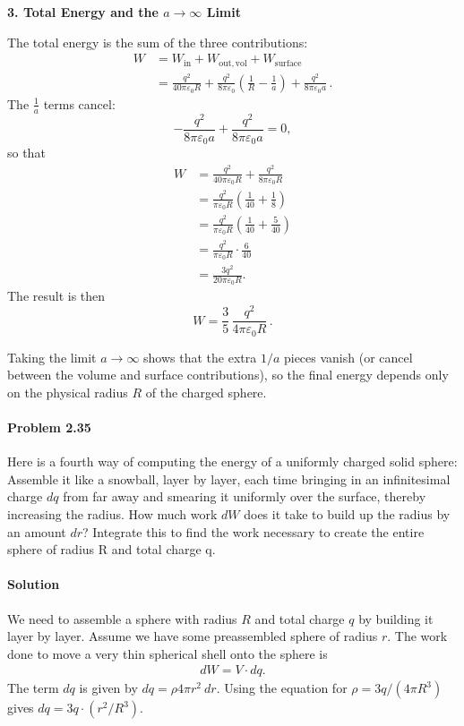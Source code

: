 \documentclass{article}
\begin{document}
\vspace{2mm}
\textbf{3. Total Energy and the \( a\to\infty \) Limit}

The total energy is the sum of the three contributions:
\begin{align*}
W &= W_{\mathrm{in}} + W_{\mathrm{out,vol}} + W_{\mathrm{surface}} \\
&=\frac{q^2}{40\pi\varepsilon_0 R} + \frac{q^2}{8\pi\varepsilon_0}\left(\frac{1}{R}-\frac{1}{a}\right) + \frac{q^2}{8\pi\varepsilon_0a}\,.
\end{align*}
The \( \frac{1}{a} \) terms cancel:
\[
-\frac{q^2}{8\pi\varepsilon_0a} + \frac{q^2}{8\pi\varepsilon_0a}=0,
\]
so that
\begin{align*}
W &= \frac{q^2}{40\pi\varepsilon_0 R} + \frac{q^2}{8\pi\varepsilon_0 R} \\
&=\frac{q^2}{\pi\varepsilon_0 R}\left(\frac{1}{40}+\frac{1}{8}\right) \\
&=\frac{q^2}{\pi\varepsilon_0 R}\left(\frac{1}{40}+\frac{5}{40}\right) \\
&=\frac{q^2}{\pi\varepsilon_0 R}\cdot\frac{6}{40} \\
&=\frac{3q^2}{20\pi\varepsilon_0 R}.
\end{align*}
The result is then
\[
\boxed{W=\frac{3}{5}\,\frac{q^2}{4\pi\varepsilon_0 R}\,.}
\]

Taking the limit \( a\to\infty \) shows that the extra \( 1/a \) pieces vanish (or cancel between the volume and surface contributions), so the final energy depends only on the physical radius \( R \) of the charged sphere.

\newpage

\paragraph{Problem 2.35}Here is a fourth way of computing the energy of a uniformly charged solid sphere: Assemble it like a snowball, layer by layer, each time bringing in an infinitesimal charge $dq$ from far away and smearing it uniformly over the surface, thereby increasing the radius. How much work $dW$ does it take to build up the radius by an amount $dr$? Integrate this to find the work necessary to create the entire sphere of radius R and total charge q.

\paragraph{Solution} We need to assemble a sphere with radius $R$ and total charge $q$ by building it layer by layer. Assume we have some preassembled sphere of radius $r$. The work done to move a very thin spherical shell onto the sphere is 
\begin{align*}
    dW = V\cdot dq.
\end{align*}
The term $dq$ is given by $dq = \rho 4\pi r^2\ dr$. Using the equation for $\rho = 3q/(4\pi R^3)$ gives $dq = 3q\cdot(r^2/R^3)$.\\
\end{document}
